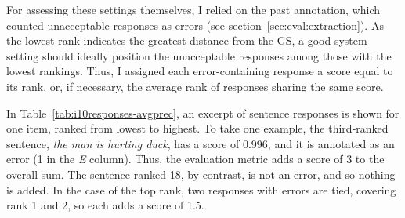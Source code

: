 For assessing these settings themselves, I relied on the past annotation,
which counted unacceptable responses as errors (see
section~\ref{sec:eval:extraction}).  As the
lowest rank indicates the greatest distance from the GS, a good system
setting should ideally position the unacceptable responses among those
with the lowest rankings. Thus, I assigned each error-containing
response a score equal to its rank, or, if necessary, the average rank
of responses sharing the same score.

In Table~\ref{tab:i10responses-avgprec}, an excerpt of sentence
responses is shown for one item, ranked from lowest to highest.  To
take one example, the third-ranked sentence, \textit{the man is hurting duck}, has a score of 0.996, and it is annotated as an error (1 in
the \textit{E} column).  Thus, the evaluation metric adds a score of 3
to the overall sum.  The sentence ranked 18, by contrast, is not an
error, and so nothing is added.  In the case of the top rank, two
responses with errors are tied, covering rank 1 and 2, so each adds a score of 1.5.

